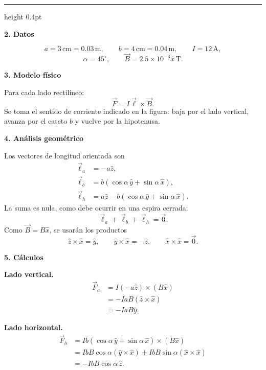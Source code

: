 \documentclass[11pt]{article}
\newcommand{\soluciontitulo}{%
  \par\medskip
  \noindent{\large\bfseries Solución.}\par
  \vspace{0.2em}\hrule height 0.4pt \vspace{0.7em}%
}
\newcommand{\paso}[1]{%
  \par\medskip
  \noindent\textbf{#1}\par
  \vspace{0.1em}%
}
\begin{document}
\soluciontitulo

\paso{2. Datos}
\begin{equation*}
    a=3\,\mathrm{cm}=0.03\,\mathrm m,
    \qquad
    b=4\,\mathrm{cm}=0.04\,\mathrm m,
    \qquad
    I=12\,\mathrm A,
\end{equation*}
\begin{equation*}
    \alpha=45^\circ,
    \qquad
    \vec B=2.5\times10^{-3}\hat x\,\mathrm T.
\end{equation*}

\paso{3. Modelo f\'isico}
Para cada lado rectil\'ineo:
\begin{equation*}
    \vec F=I\vec\ell\times\vec B.
\end{equation*}
Se toma el sentido de corriente indicado en la figura: baja por el lado vertical, avanza por el cateto $b$ y vuelve por la hipotenusa.

\paso{4. An\'alisis geom\'etrico}
Los vectores de longitud orientada son
\begin{align*}
    \vec\ell_a&=-a\hat z,\\
    \vec\ell_b&=b(\cos\alpha\,\hat y+\sin\alpha\,\hat x),\\
    \vec\ell_h&=a\hat z-b(\cos\alpha\,\hat y+\sin\alpha\,\hat x).
\end{align*}
La suma es nula, como debe ocurrir en una espira cerrada:
\begin{equation*}
    \vec\ell_a+\vec\ell_b+\vec\ell_h=\vec0.
\end{equation*}
Como $\vec B=B\hat x$, se usar\'an los productos
\begin{equation*}
    \hat z\times\hat x=\hat y,
    \qquad
    \hat y\times\hat x=-\hat z,
    \qquad
    \hat x\times\hat x=\vec0.
\end{equation*}

\paso{5. C\'alculos}
\textbf{Lado vertical.}
\begin{align*}
    \vec F_a
    &=I(-a\hat z)\times(B\hat x)\\
    &=-IaB(\hat z\times\hat x)\\
    &=-IaB\hat y.
\end{align*}

\textbf{Lado horizontal.}
\begin{align*}
    \vec F_b
    &=Ib(\cos\alpha\,\hat y+\sin\alpha\,\hat x)\times(B\hat x)\\
    &=IbB\cos\alpha(\hat y\times\hat x)+IbB\sin\alpha(\hat x\times\hat x)\\
    &=-IbB\cos\alpha\,\hat z.
\end{align*}
\end{document}

